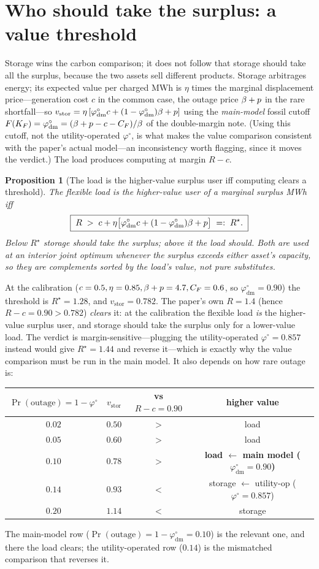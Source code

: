 \documentclass[11pt,reqno]{amsart}
\theoremstyle{plain}\newtheorem{proposition}{Proposition}\newtheorem{corollary}[proposition]{Corollary}
\theoremstyle{remark}\newtheorem{remark}[proposition]{Remark}
\newcommand{\phio}{\varphi^{\circ}}
\begin{document}
\section{Who should take the surplus: a value threshold}
Storage wins the carbon comparison; it does not follow that storage should take all the
surplus, because the two assets sell different products. Storage arbitrages energy; its
expected value per charged MWh is $\eta$ times the marginal displacement price---generation
cost $c$ in the common case, the outage price $\beta+p$ in the rare shortfall---so
$v_{\mathrm{stor}}=\eta\,[\phio_{\mathrm{dm}}c+(1-\phio_{\mathrm{dm}})\bp]$ using the
\emph{main-model} fossil cutoff $F(\KF)=\phio_{\mathrm{dm}}=(\bp-c-\CF)/\beta$ of the
double-margin note. (Using this cutoff, not the utility-operated $\phio$, is what makes the
value comparison consistent with the paper's actual model---an inconsistency worth flagging,
since it moves the verdict.) The load produces computing at margin $R-c$.
\begin{proposition}[The load is the higher-value surplus user iff computing clears a threshold]
\label{prop:threshold}
The flexible load is the higher-value user of a marginal surplus MWh iff
\[
  \boxed{\;R \;>\; c+\eta\big[\phio_{\mathrm{dm}}c+(1-\phio_{\mathrm{dm}})\bp\big]\;=:\;R^{\star}.\;}
\]
Below $R^{\star}$ storage should take the surplus; above it the load should. Both are used at
an interior joint optimum whenever the surplus exceeds either asset's capacity, so they are
\emph{complements sorted by the load's value}, not pure substitutes.
\end{proposition}
At the calibration ($c=0.5,\eta=0.85,\beta+p=4.7,C_F=0.6$, so $\phio_{\mathrm{dm}}=0.90$) the
threshold is $R^{\star}=1.28$, and $v_{\mathrm{stor}}=0.782$. The paper's own $R=1.4$
(hence $R-c=0.90>0.782$) \emph{clears} it: at the calibration the flexible load \emph{is} the
higher-value surplus user, and storage should take the surplus only for a lower-value load.
The verdict is margin-sensitive---plugging the utility-operated $\phio=0.857$ instead would
give $R^{\star}=1.44$ and reverse it---which is exactly why the value comparison must be run
in the main model. It also depends on how rare outage is:
\begin{center}\small
\begin{tabular}{cccc}
\toprule
$\Pr(\text{outage})=1-\phio$ & $v_{\mathrm{stor}}$ & vs $R-c=0.90$ & higher value\\
\midrule
$0.02$ & $0.50$ & $>$ & load\\
$0.05$ & $0.60$ & $>$ & load\\
$\mathbf{0.10}$ & $\mathbf{0.78}$ & $\mathbf{>}$ & \textbf{load $\leftarrow$ main model ($\phio_{\mathrm{dm}}=0.90$)}\\
$0.14$ & $0.93$ & $<$ & storage $\leftarrow$ utility-op ($\phio=0.857$)\\
$0.20$ & $1.14$ & $<$ & storage\\
\bottomrule
\end{tabular}
\end{center}
The main-model row ($\Pr(\text{outage})=1-\phio_{\mathrm{dm}}=0.10$) is the relevant one, and
there the load clears; the utility-operated row ($0.14$) is the mismatched comparison that
reverses it.
\end{document}
